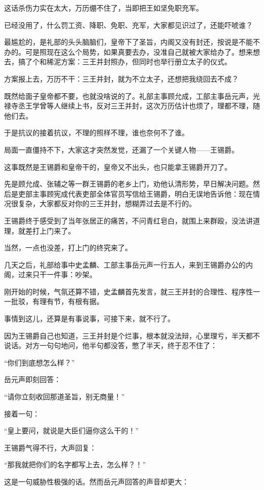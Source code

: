 \begin{multicols}{\theparacolNo}
这话杀伤力实在太大，万历绷不住了，当即把王如坚免职充军。

已经没用了，什么罚工资、降职、免职、充军，大家都见识过了，还能吓唬谁？

最尴尬的，是礼部的头头脑脑们，皇帝下了圣旨，内阁又没有封还，按说是不能不办的。可是照现在这么个局势，如果真要去办，没准自己就被大家给办了。想来想去，搞了个和稀泥方案：三王并封照办，但同时也举行册立太子的仪式。

方案报上去，万历不干：三王并封，就为不立太子，还想把我绕回去不成？

既然给面子皇帝都不要，也就没啥说的了。礼部主事顾允成，工部主事岳元声，光禄寺丞王学曾等人继续上书，反对三王并封，这次万历估计也烦了，理都不理，随他们去。

于是抗议的接着抗议，不理的照样不理，谁也奈何不了谁。

局面一直僵持不下，大家这才突然发觉，还漏了一个关键人物——王锡爵。

这事既然是王锡爵和皇帝干的，皇帝又不出头，也只能拿王锡爵开刀了。

先是顾允成、张辅之等一群王锡爵的老乡上门，劝他认清形势，早日解决问题。然后是吏部主事顾宪成代表吏部全体官员写信给王锡爵，明白无误地告诉他：现在情况很复杂，大家都反对你的三王并封，想糊弄过去是不行的。

王锡爵终于感受到了当年张居正的痛苦，不问青红皂白，就围上来群殴，没法讲道理，就差打上门来了。

当然，一点也没差，打上门的终究来了。

几天之后，礼部给事中史孟麟、工部主事岳元声一行五人，来到王锡爵办公的内阁，过来只干一件事：吵架。

刚开始的时候，气氛还算不错，史孟麟首先发言，就三王并封的合理性、程序性一一批驳，有理有节，有根有据。

事情到这儿，还算是有事说事，可接下来，就不行了。

因为王锡爵自己也知道，三王并封是个烂事，根本就没法辩，心里理亏，半天都不说话。对方一句句地问，他半句都没答，憋了半天，终于忍不住了：

“你们到底想怎么样？”

岳元声即刻回答：

“请你立刻收回那道圣旨，别无商量！”

接着一句：

“皇上要问，就说是大臣们逼你这么干的！”

王锡爵气得不行，大声回复：

“那我就把你们的名字都写上去，怎么样？！”

这是一句威胁性极强的话。然而岳元声回答的声音却更大：


\end{multicols}
